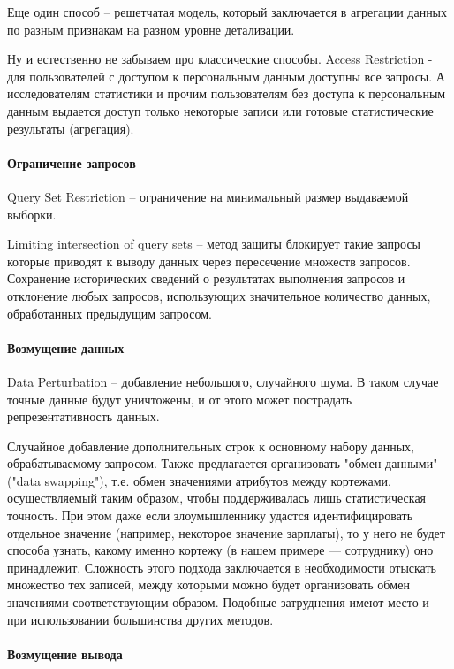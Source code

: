 Еще один способ -- решетчатая модель, который заключается в агрегации данных по разным признакам на разном уровне детализации.

Ну и естественно не забываем про классические способы.
Access Restriction - для пользователей с доступом к персональным данным доступны все запросы. А исследователям статистики и прочим пользователям без доступа к персональным данным выдается доступ только некоторые записи или готовые статистические результаты (агрегация).

\paragraph{Ограничение запросов}

Query Set Restriction -- ограничение на минимальный размер выдаваемой выборки.

Limiting intersection of query sets -- метод защиты блокирует такие запросы которые приводят к выводу данных через пересечение множеств запросов.
Сохранение исторических сведений о результатах выполнения запросов и отклонение любых запросов, использующих значительное количество данных, обработанных предыдущим запросом.

\paragraph{Возмущение данных}

Data Perturbation -- добавление небольшого, случайного шума. В таком случае точные данные будут уничтожены, и от этого может пострадать репрезентативность данных.

Случайное добавление дополнительных строк к основному набору данных, обрабатываемому запросом.
Также предлагается организовать "обмен данными" ("data swapping"), т.е. обмен значениями атрибутов между кортежами, осуществляемый таким образом, чтобы поддерживалась лишь статистическая точность. При этом даже если злоумышленнику удастся идентифицировать отдельное значение (например, некоторое значение зарплаты), то у него не будет способа узнать, какому именно кортежу (в нашем примере — сотруднику) оно принадлежит. Сложность этого подхода заключается в необходимости отыскать множество тех записей, между которыми можно будет организовать обмен значениями соответствующим образом. Подобные затруднения имеют место и при использовании большинства других методов.

\paragraph{Возмущение вывода}

